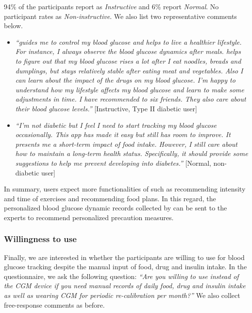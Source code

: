 {94\% of the participants report \sysname as \textit{Instructive} and 6\% report \textit{Normal}.
No participant rates \sysname as \textit{Non-instructive}.
We also list two representative comments below.
\begin{itemize}
  \item
  \textit{``\sysname guides me to control my blood glucose and helps to live a healthier lifestyle.
  For instance, I always observe the blood glucose dynamics after meals.
  \sysname helps to figure out that my blood glucose rises a lot after I eat noodles, breads and dumplings, but stays relatively stable after eating meat and vegetables.
  Also I can learn about the impact of the drugs on my blood glucose.
  I'm happy to understand how my lifestyle affects my blood glucose and learn to make some adjustments in time.
  I have recommended \sysname to six friends.
  They also care about their blood glucose levels.''}
  [Instructive, Type II diabetic user]
  \item
  \textit{``I'm not diabetic but I feel I need to start tracking my blood glucose occasionally.
  This app has made it easy but still has room to improve.
  It presents me a short-term impact of food intake.
  However, I still care about how to maintain a long-term health status.
  Specifically, it should provide some suggestions to help me prevent developing into diabetes.''}
  [Normal, non-diabetic user]
\end{itemize}
In summary, users expect more functionalities of \sysname such as recommending intensity and time of exercises and recommending food plans.
In this regard, the personalized blood glucose dynamic records collected by \sysname can be sent to the experts to recommend personalized precaution measures.

\subsubsection{Willingness to use \sysname}
Finally, we are interested in whether the participants are willing to use \sysname for blood glucose tracking despite the manual input of food, drug and insulin intake.
In the questionnaire, we ask the following question:
\textit{``Are you willing to use \sysname instead of the CGM device if you need manual records of daily food, drug and insulin intake as well as wearing CGM for periodic re-calibration per month?''}
We also collect free-response comments as before.

}
